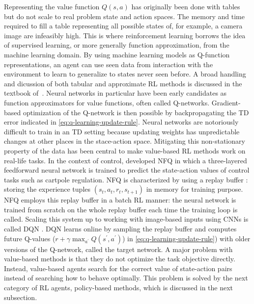 \documentclass[\home/main.tex]{subfiles}
\begin{document}
Representing the value function $Q(s, a)$ has originally been done with tables \autocite{watkins1992q} but do not scale to real problem state and action spaces. The memory and time required to fill a table representing all possible states of, for example, a camera image are infeasibly high. This is where reinforcement learning borrows the idea of supervised learning, or more generally function approximation, from the machine learning domain. By using machine learning models as Q-function representations, an agent can use seen data from interaction with the environment to learn to generalize to states never seen before. A broad handling and dicussion of both tabular and approximate RL methods is discussed in the textbook of~\textcite{Sutton2018}. Neural networks in particular have been early candidates as function approximators for value functions, often called Q-networks. Gradient-based optimization of the Q-network is then possible by backpropagating the TD error indicated in \cref{eq:q-learning-update-rule}. Neural networks are notoriously difficult to train in an TD setting because updating weights has unpredictable changes at other places in the stace-action space. Mitigating this non-stationary property of the data has been central to make value-based RL methods work on real-life tasks. In the context of control, \textcite{riedmiller2005neural} developed \gls{NFQ} in which a three-layered feedforward neural network is trained to predict the state-action values of control tasks such as cartpole regulation. \Gls{NFQ} is characterized by using a replay buffer  \autocite{lin1992reinforcement}: storing the experience tuples $(s_t, a_t, r_t, s_{t+1})$ in memory for training purpose. \gls{NFQ} employs this replay buffer in a batch RL manner: the neural network is trained from scratch on the whole replay buffer each time the training loop is called. Scaling this system up to working with image-based inputs using \glspl{CNN} is called \gls{DQN} \autocite{mnih2015human}. \Gls{DQN} learns online by sampling the replay buffer and computes future Q-values ($r+\gamma\max _{a^{\prime}} Q\left(s^{\prime}, a^{\prime}\right)$) in \cref{eq:q-learning-update-rule}) with older versions of the Q-network, called the target network. A major problem with value-based methods is that they do not optimize the task objective directly. Instead, value-based agents search for the correct value of state-action pairs instead of searching how to behave optimally. This problem is solved by the next category of RL agents, policy-based methods, which is discussed in the next subsection.
\end{document}
